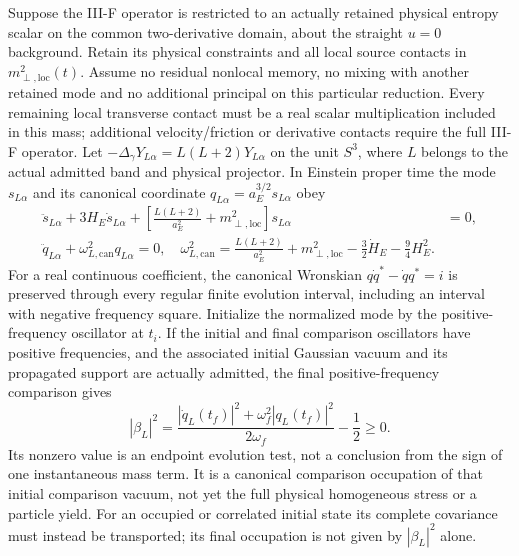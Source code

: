 \documentclass[12pt,a4paper]{article}
\begin{document}
\begin{corollary}
\label{p8:cor:v2210-lit-closed-entropy-pump}
Suppose the III-F operator is restricted to an actually retained physical
entropy scalar on the common two-derivative domain, about the straight
$u=0$ background. Retain its physical constraints and all local source
contacts in $m_{\perp,\mathrm{loc}}^2(t)$. Assume no residual nonlocal
memory, no mixing with another retained mode and no additional principal
on this particular reduction. Every remaining local transverse contact
must be a real scalar multiplication included in this mass; additional
velocity/friction or derivative contacts require the full III-F operator.
Let
$-\Delta_\gamma Y_{L\alpha}=L(L+2)Y_{L\alpha}$ on the unit $S^3$,
where $L$ belongs to the actual admitted band and physical projector.
In Einstein proper time the mode $s_{L\alpha}$ and its canonical coordinate
$q_{L\alpha}=a_E^{3/2}s_{L\alpha}$ obey
\begin{align}
 \ddot s_{L\alpha}+3H_E\dot s_{L\alpha}
     +\left[\frac{L(L+2)}{a_E^2}
                 +m_{\perp,\mathrm{loc}}^2\right]s_{L\alpha}&=0,
 \label{p8:eq:v2210-lit-closed-entropy-mode}\\
 \boxed{\ddot q_{L\alpha}+\omega_{L,\mathrm{can}}^2q_{L\alpha}=0,
 \quad\omega_{L,\mathrm{can}}^2
     =\frac{L(L+2)}{a_E^2}+m_{\perp,\mathrm{loc}}^2
                   -\frac32\dot H_E-\frac94H_E^2.}
 \label{p8:eq:v2210-lit-closed-entropy-frequency}
\end{align}
For a real continuous coefficient, the canonical Wronskian
$q\dot q^*-\dot q q^*=i$ is preserved through every regular finite
evolution interval, including an interval with negative frequency square.
Initialize the normalized mode by the positive-frequency oscillator at
$t_i$. If the initial and final comparison oscillators have positive
frequencies, and the associated initial Gaussian vacuum and its propagated
support are actually admitted, the final positive-frequency comparison gives
\begin{equation}
\label{p8:eq:v2210-lit-finite-pump-readout}
 \boxed{|\beta_L|^2
  =\frac{|\dot q_L(t_f)|^2+\omega_f^2|q_L(t_f)|^2}{2\omega_f}
                                                      -\frac12\ge0.}
\end{equation}
Its nonzero value is an endpoint evolution test, not a conclusion from
the sign of one instantaneous mass term. It is a canonical comparison
occupation of that initial comparison vacuum, not yet the full physical
homogeneous stress or a particle yield. For an occupied or correlated
initial state its complete covariance must instead be transported; its
final occupation is not given by $|\beta_L|^2$ alone.
\end{corollary}
\end{document}
